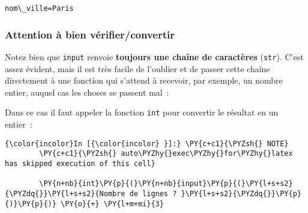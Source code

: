     \begin{Verbatim}[commandchars=\\\{\},frame=single,framerule=0.3mm,rulecolor=\color{cellframecolor}]
nom\_ville=Paris
\end{Verbatim}

    \hypertarget{attention-uxe0-bien-vuxe9rifierconvertir}{%
\subsubsection{Attention à bien
vérifier/convertir}\label{attention-uxe0-bien-vuxe9rifierconvertir}}

    Notez bien que \texttt{input} renvoie \textbf{toujours une chaîne de
caractères} (\texttt{str}). C'est assez évident, mais il est très facile
de l'oublier et de passer cette chaîne directement à une fonction qui
s'attend à recevoir, par exemple, un nombre entier, auquel cas les
choses se passent mal~:

    \begin{Shaded}
\begin{Highlighting}[frame=lines,framerule=0.6mm,rulecolor=\color{asisframecolor}]
\OperatorTok{>>>} \NormalTok{(}\NormalTok{) }\OperatorTok{+} 
\NormalTok{, } \OperatorTok{<}\OperatorTok{>}
\NormalTok{, } 
\end{Highlighting}
\end{Shaded}

    Dans ce cas il faut appeler la fonction \texttt{int} pour convertir le
résultat en un entier~:

    \begin{Verbatim}[commandchars=\\\{\},frame=single,framerule=0.3mm,rulecolor=\color{cellframecolor}]
{\color{incolor}In [{\color{incolor} }]:} \PY{c+c1}{\PYZsh{} NOTE}
        \PY{c+c1}{\PYZsh{} auto\PYZhy{}exec\PYZhy{}for\PYZhy{}latex has skipped execution of this cell}
        
        \PY{n+nb}{int}\PY{p}{(}\PY{n+nb}{input}\PY{p}{(}\PY{l+s+s2}{\PYZdq{}}\PY{l+s+s2}{Nombre de lignes ? }\PY{l+s+s2}{\PYZdq{}}\PY{p}{)}\PY{p}{)} \PY{o}{+} \PY{l+m+mi}{3}
\end{Verbatim}


